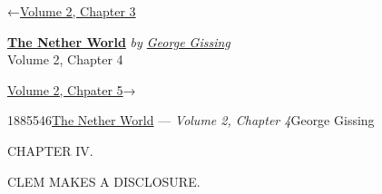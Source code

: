 \hypertarget{headerContainer}{}
\hypertarget{navigationHeader}{}
\protect\hypertarget{headerprevious}{}{←\href{/wiki/The_Nether_World/Volume_2/Chapter_3}{Volume
2, Chapter 3}}

\textbf{\protect\hypertarget{header_title_text}{}{\href{/wiki/The_Nether_World}{The
Nether World}}} \emph{by
\href{/wiki/Author:George_Gissing}{\protect\hypertarget{header_author_text}{}{{George
Gissing}}}}\\
\protect\hypertarget{header_section_text}{}{Volume 2, Chapter 4}

\protect\hypertarget{headernext}{}{\href{/wiki/The_Nether_World/Volume_2/Chapter_5}{Volume
2, Chpater 5}→}

\hypertarget{navigationNotes}{}

\hypertarget{ws-data}{}
\protect\hypertarget{ws-article-id}{}{1885546}\protect\hypertarget{ws-title}{}{\href{/wiki/The_Nether_World}{The
Nether World} --- \emph{Volume 2, Chapter
4}}\protect\hypertarget{ws-author}{}{George Gissing}

{\protect\hypertarget{59}{}{}}

{CHAPTER IV.}

CLEM MAKES A DISCLOSURE.

